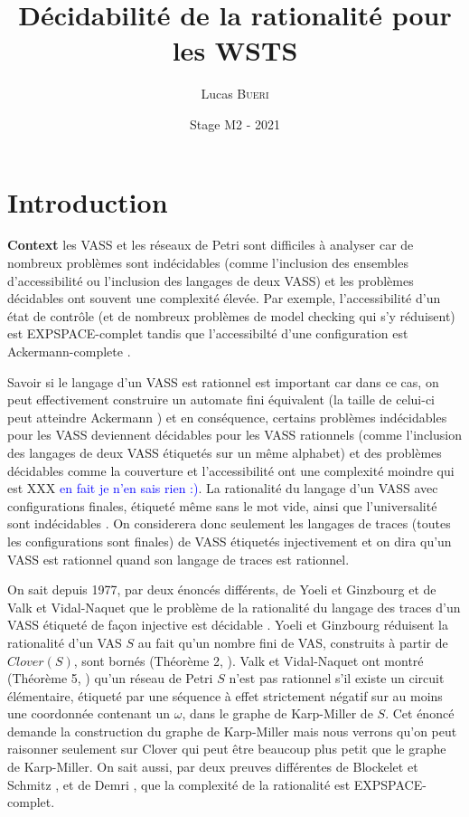 \documentclass[a4paper,final]{article}
\title{Décidabilité de la rationalité pour les WSTS}
\author{Lucas \textsc{Bueri}}
\date{Stage M2 - 2021}
\theoremstyle{definition}
\newcommand{\alain}[1]{\textcolor{blue}{#1}}
\begin{document}
\maketitle


\section{Introduction}

{\bf Context} les VASS et les  réseaux de Petri sont difficiles à analyser car de nombreux problèmes sont indécidables (comme l'inclusion des ensembles d'accessibilité ou l'inclusion des langages de deux VASS) et les problèmes décidables ont souvent une complexité élevée. Par exemple, l'accessibilité d'un état de contrôle (et de nombreux problèmes de model checking qui s'y réduisent) est EXPSPACE-complet tandis que l'accessibilté d'une configuration est Ackermann-complete \cite{DBLP:journals/corr/abs-2104-12695,DBLP:journals/corr/abs-2105-08551}. 

Savoir si le langage d'un VASS est rationnel est important car dans ce cas, on peut effectivement construire un automate fini équivalent (la taille de celui-ci peut atteindre Ackermann \cite{vavn81}) et en conséquence, certains problèmes indécidables pour les VASS deviennent décidables pour les VASS rationnels (comme l'inclusion des langages de deux VASS étiquetés sur un même alphabet) et des problèmes décidables comme la couverture et l'accessibilité ont une complexité moindre qui est XXX \alain{en fait je n'en sais rien :)}. La rationalité du langage d'un VASS avec configurations finales, étiqueté même sans le mot vide, ainsi que l'universalité sont indécidables \cite{giyo80}. On considerera donc seulement les langages de traces (toutes les configurations sont finales) de VASS étiquetés injectivement et on dira qu'un VASS est rationnel quand son langage de traces est rationnel. 

On sait depuis 1977, par deux énoncés différents, de Yoeli et Ginzbourg  \cite{giyo80} et de Valk et Vidal-Naquet \cite{DBLP:conf/tcs/ValkV77,giyo80} que le problème de la rationalité du langage des traces d'un VASS étiqueté de façon injective est décidable \cite{giyo80,vavn81}. Yoeli et Ginzbourg réduisent la rationalité d'un VAS $S$ au fait qu'un nombre fini de VAS, construits à partir de $Clover(S)$, sont bornés (Théorème 2, \cite{giyo80}). Valk et Vidal-Naquet ont montré (Théorème 5,  \cite{vavn81}) qu'un réseau de Petri $S$ n'est pas rationnel s'il existe un circuit élémentaire, étiqueté par une séquence à effet strictement négatif sur au moins une coordonnée contenant un $\omega$, dans le graphe de Karp-Miller de $S$. Cet énoncé demande la construction du graphe de Karp-Miller mais nous verrons qu'on peut raisonner seulement sur Clover qui peut être beaucoup plus petit que le graphe de Karp-Miller.
On sait aussi, par deux preuves différentes de Blockelet et Schmitz \cite{DBLP:conf/mfcs/BlockeletS11}, et de Demri \cite{DBLP:journals/jcss/Demri13}, que la complexité de la rationalité est EXPSPACE-complet. %
\end{document}
